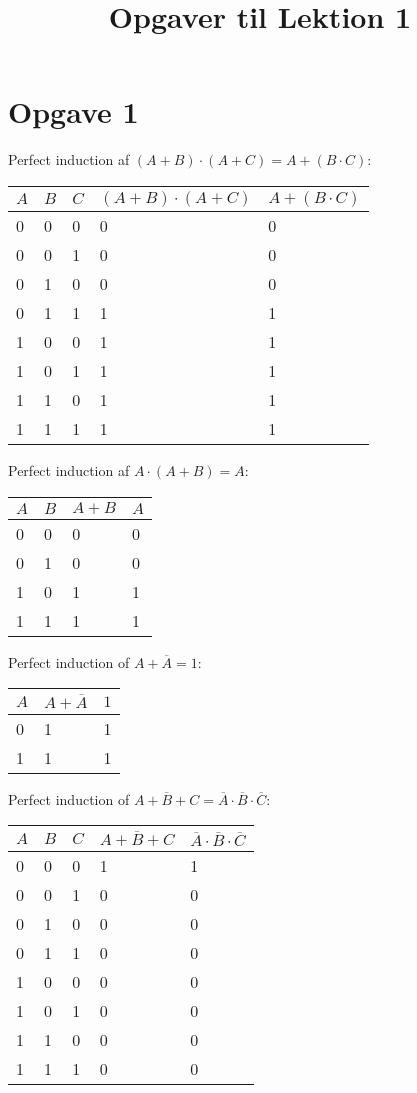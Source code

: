 \title{Opgaver til Lektion 1}

\let\inv\overline

\section{Opgave 1}

Perfect induction af $(A + B) \cdot (A + C) = A + (B \cdot C)$:

\begin{tabular}{lll|ll} \toprule
    $A$ & $B$ & $C$ & $(A + B) \cdot (A + C)$ & $A + (B \cdot C)$ \\ \midrule
    0 & 0 & 0 & 0 & 0 \\
    0 & 0 & 1 & 0 & 0 \\
    0 & 1 & 0 & 0 & 0 \\
    0 & 1 & 1 & 1 & 1 \\
    1 & 0 & 0 & 1 & 1 \\
    1 & 0 & 1 & 1 & 1 \\
    1 & 1 & 0 & 1 & 1 \\
    1 & 1 & 1 & 1 & 1 \\ \bottomrule
\end{tabular}

Perfect induction af $A \cdot (A + B) = A$:

\begin{tabular}{ll|ll} \toprule
    $A$ & $B$ & $A + B$ & $A$ \\ \midrule
    0 & 0 & 0 & 0 \\
    0 & 1 & 0 & 0 \\
    1 & 0 & 1 & 1 \\
    1 & 1 & 1 & 1 \\ \bottomrule
\end{tabular}

Perfect induction of $A + \inv{A} = 1$:

\begin{tabular}{l|ll} \toprule
    $A$ & $A + \inv{A} $ & $1$ \\ \midrule
    0 & 1 & 1 \\
    1 & 1 & 1 \\ \bottomrule
\end{tabular}

Perfect induction of $\inv{A + B + C} = \inv{A} \cdot \inv{B} \cdot \inv{C}$:

\begin{tabular}{lll|ll} \toprule
    $A$ & $B$ & $C$ & $\inv{A + B + C}$ & $\inv{A} \cdot \inv{B} \cdot \inv{C}$ \\ \midrule
    0 & 0 & 0 & 1 & 1 \\
    0 & 0 & 1 & 0 & 0 \\
    0 & 1 & 0 & 0 & 0 \\
    0 & 1 & 1 & 0 & 0 \\
    1 & 0 & 0 & 0 & 0 \\
    1 & 0 & 1 & 0 & 0 \\
    1 & 1 & 0 & 0 & 0 \\
    1 & 1 & 1 & 0 & 0 \\ \bottomrule
\end{tabular}

